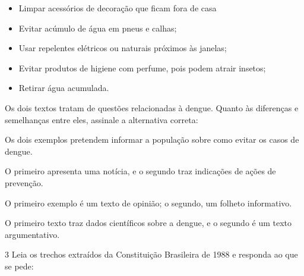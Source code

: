 \begin{myquote}
\begin{itemize}
  \item Limpar acessórios de decoração que ficam fora de casa 

  \item Evitar acúmulo de água em pneus e calhas;
  
  \item Usar repelentes elétricos ou naturais próximos às janelas;
  
  \item Evitar produtos de higiene com perfume, pois podem atrair insetos;
  
  \item Retirar água acumulada.
 
\end{itemize}


\end{myquote}

Os dois textos tratam de questões relacionadas à dengue. Quanto às diferenças
e semelhanças entre eles, assinale a alternativa correta:

\begin{escolha}

    \item Os dois exemplos pretendem informar a população sobre como evitar os casos de dengue.

    \item O primeiro apresenta uma notícia, e o segundo traz indicações de ações de prevenção.

    \item O primeiro exemplo é um texto de opinião; o segundo, um folheto informativo.

    \item O primeiro texto traz dados científicos sobre a dengue, e o segundo é um texto argumentativo.

\end{escolha}

\num{3} Leia os trechos extraídos da Constituição Brasileira de 1988 e responda
ao que se pede:

